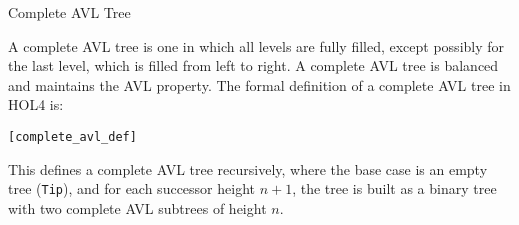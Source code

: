 \begin{defn}{Complete AVL Tree}

A complete AVL tree is one in which all levels are fully filled, except possibly for the last level, which is filled from left to right. A complete AVL tree is balanced and maintains the AVL property. The formal definition of a complete AVL tree in HOL4 is:

\begin{alltt}
	[complete_avl_def]
\end{alltt}

This defines a complete AVL tree recursively, where the base case is an empty tree (\texttt{Tip}), and for each successor height \(n+1\), the tree is built as a binary tree with two complete AVL subtrees of height \(n\).
\end{defn}



